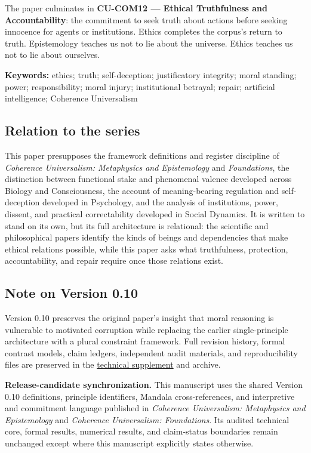 \documentclass[
  11pt,
]{article}
\begin{document}
The paper culminates in \textbf{CU-COM12 --- Ethical Truthfulness and
Accountability}: the commitment to seek truth about actions before
seeking innocence for agents or institutions. Ethics completes the
corpus's return to truth. Epistemology teaches us not to lie about the
universe. Ethics teaches us not to lie about ourselves.

\textbf{Keywords:} ethics; truth; self-deception; justificatory
integrity; moral standing; power; responsibility; moral injury;
institutional betrayal; repair; artificial intelligence; Coherence
Universalism

\subsection{Relation to the series}\label{relation-to-the-series}

This paper presupposes the framework definitions and register discipline
of \emph{Coherence Universalism: Metaphysics and Epistemology} and
\emph{Foundations}, the distinction between functional stake and
phenomenal valence developed across Biology and Consciousness, the
account of meaning-bearing regulation and self-deception developed in
Psychology, and the analysis of institutions, power, dissent, and
practical correctability developed in Social Dynamics. It is written to
stand on its own, but its full architecture is relational: the
scientific and philosophical papers identify the kinds of beings and
dependencies that make ethical relations possible, while this paper asks
what truthfulness, protection, accountability, and repair require once
those relations exist.

\subsection{Note on Version 0.10}\label{note-on-version-0.10}

Version 0.10 preserves the original paper's insight that moral reasoning
is vulnerable to motivated corruption while replacing the earlier
single-principle architecture with a plural constraint framework. Full
revision history, formal contrast models, claim ledgers, independent
audit materials, and reproducibility files are preserved in the
\href{../supplements/08_Ethics_Technical_Supplement_v0.10.md}{technical
supplement} and archive.

\textbf{Release-candidate synchronization.} This manuscript uses the
shared Version 0.10 definitions, principle identifiers, Mandala
cross-references, and interpretive and commitment language published in
\emph{Coherence Universalism: Metaphysics and Epistemology} and
\emph{Coherence Universalism: Foundations}. Its audited technical core,
formal results, numerical results, and claim-status boundaries remain
unchanged except where this manuscript explicitly states otherwise.
\end{document}

